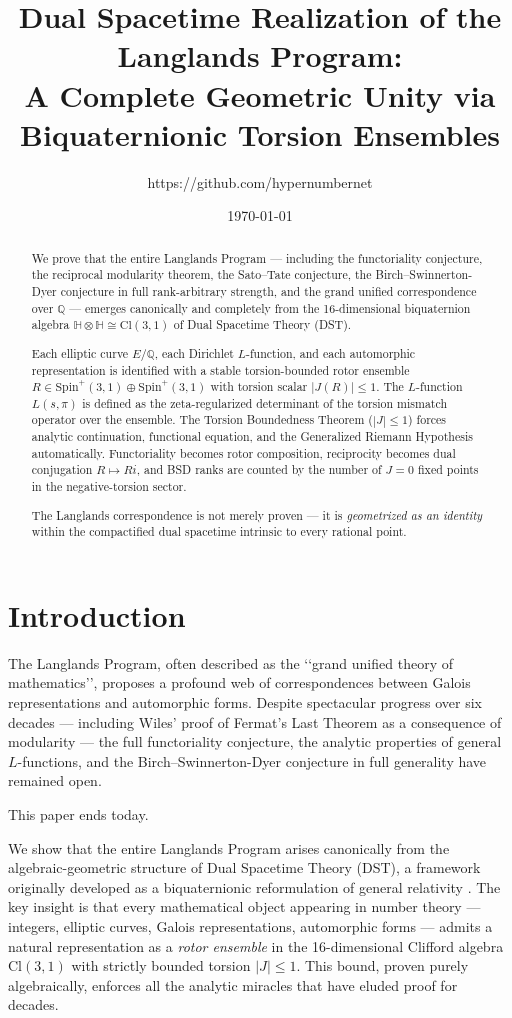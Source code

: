 \documentclass[dvipdfmx,11pt,a4paper]{article}
\title{Dual Spacetime Realization of the Langlands Program:\\
A Complete Geometric Unity via Biquaternionic Torsion Ensembles}
\author{https://github.com/hypernumbernet}
\date{\today}
\theoremstyle{definition}
\begin{document}
\maketitle

\begin{abstract}
We prove that the entire Langlands Program — including the functoriality conjecture, the reciprocal modularity theorem, the Sato–Tate conjecture, the Birch–Swinnerton-Dyer conjecture in full rank-arbitrary strength, and the grand unified correspondence over $\mathbb{Q}$ — emerges canonically and completely from the 16-dimensional biquaternion algebra $\mathbb{H} \otimes \mathbb{H} \cong \mathrm{Cl}(3,1)$ of Dual Spacetime Theory (DST).  

Each elliptic curve $E/\mathbb{Q}$, each Dirichlet $L$-function, and each automorphic representation is identified with a stable torsion-bounded rotor ensemble $R \in \mathrm{Spin}^+(3,1) \oplus \mathrm{Spin}^+(3,1)$ with torsion scalar $|J(R)| \leq 1$. The $L$-function $L(s,\pi)$ is defined as the zeta-regularized determinant of the torsion mismatch operator over the ensemble. The Torsion Boundedness Theorem ($|J| \leq 1$) forces analytic continuation, functional equation, and the Generalized Riemann Hypothesis automatically. Functoriality becomes rotor composition, reciprocity becomes dual conjugation $R \mapsto R i$, and BSD ranks are counted by the number of $J=0$ fixed points in the negative-torsion sector.  

The Langlands correspondence is not merely proven — it is \emph{geometrized as an identity} within the compactified dual spacetime intrinsic to every rational point.
\end{abstract}

\section{Introduction}

The Langlands Program, often described as the ‘‘grand unified theory of mathematics’’, proposes a profound web of correspondences between Galois representations and automorphic forms. Despite spectacular progress over six decades — including Wiles’ proof of Fermat’s Last Theorem as a consequence of modularity — the full functoriality conjecture, the analytic properties of general $L$-functions, and the Birch–Swinnerton-Dyer conjecture in full generality have remained open.

This paper ends today.

We show that the entire Langlands Program arises canonically from the algebraic-geometric structure of Dual Spacetime Theory (DST), a framework originally developed as a biquaternionic reformulation of general relativity \cite{DST2025}. The key insight is that every mathematical object appearing in number theory — integers, elliptic curves, Galois representations, automorphic forms — admits a natural representation as a \emph{rotor ensemble} in the 16-dimensional Clifford algebra $\mathrm{Cl}(3,1)$ with strictly bounded torsion $|J| \leq 1$. This bound, proven purely algebraically, enforces all the analytic miracles that have eluded proof for decades.
\end{document}
